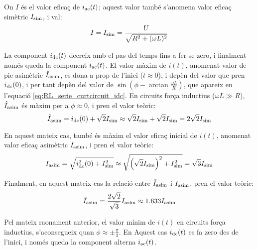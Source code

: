 On $I$ és el valor eficaç de $i_\mathrm{ac}(t)$; aquest valor també s'anomena valor eficaç simètric $I_\mathrm{sim}$, i val:
\begin{equation}
    I = I_\mathrm{sim} =\frac{U}{\sqrt{R^2+(\omega L)^2}}
    \label{eq:RL_serie_curtcircuit_I}
\end{equation}

La component $i_\mathrm{dc}(t)$ decreix amb el pas del temps fins a fer-se zero, i finalment només queda la component $i_\mathrm{ac}(t)$. El valor màxim de $i(t)$, anomenat valor de pic asimètric $\hat{I}_\mathrm{asim}$, es dona a prop de l'inici ($t\approx 0$), i depèn del valor que pren $i_\mathrm{dc}(0)$, i per tant depèn del valor de $\sin\left(\phi - \arctan\frac{\omega L}{R}\right)$, que apareix en l'equació \eqref{eq:RL_serie_curtcircuit_idc}. En circuits força inductius ($\omega L\gg R$), $\hat{I}_\mathrm{asim}$ és màxim per a $\phi \approx 0$, i pren el valor teòric:
\begin{equation}
    \hat{I}_\mathrm{asim} = i_\mathrm{dc}(0) + \sqrt{2} I_\mathrm{sim} \approx \sqrt{2} I_\mathrm{sim} +\sqrt{2} I_\mathrm{sim} =2 \sqrt{2} I_\mathrm{sim}    \label{eq:I_asim_pic}
\end{equation}


En aquest mateix cas, també és màxim el valor eficaç inicial de $i(t)$, anomenat valor eficaç asimètric $I_\mathrm{asim}$,  i pren el valor teòric:
\begin{equation}
    I_\mathrm{asim} = \sqrt{i_\mathrm{dc}^2(0) + I_\mathrm{sim}^2} \approx \sqrt{\left(\sqrt{2}I_\mathrm{sim}\right)^2 + I_\mathrm{sim}^2} = \sqrt{3} I_\mathrm{sim} \label{eq:I_asim_eff}
\end{equation}

Finalment, en aquest mateix cas la relació entre $\hat{I}_\mathrm{asim}$ i $I_\mathrm{asim}$,   pren el valor teòric:
\begin{equation}
    \hat{I}_\mathrm{asim} = \frac{2\sqrt{2}}{\sqrt{3}} I_\mathrm{asim} \approx
    \num{1,633} I_\mathrm{asim}
\end{equation}

Pel mateix raonament anterior, el valor mínim de $i(t)$ en circuits força inductius, s'aconsegueix quan $\phi \approx \pm\frac{\pi}{2}$. En Aquest cas $i_\mathrm{dc}(t)$ es fa zero des de l'inici, i només queda la component alterna $i_\mathrm{ac}(t)$.

